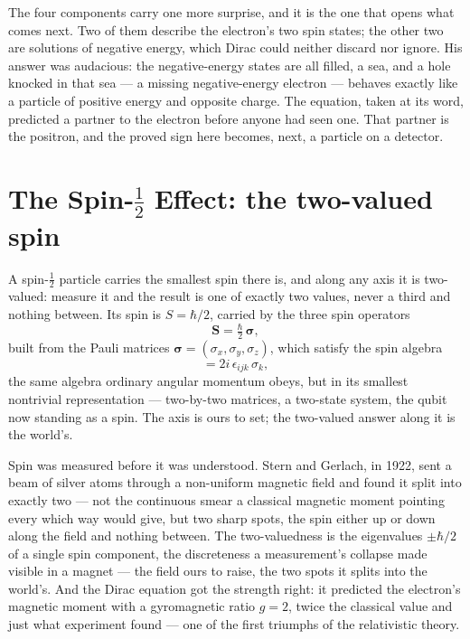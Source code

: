 The four components carry one more surprise, and it is the one that opens what comes next. Two of them describe
the electron's two spin states; the other two are solutions of negative energy, which Dirac could neither
discard nor ignore. His answer was audacious: the negative-energy states are all filled, a sea, and a hole
knocked in that sea --- a missing negative-energy electron --- behaves exactly like a particle of positive
energy and opposite charge. The equation, taken at its word, predicted a partner to the electron before anyone
had seen one. That partner is the positron, and the proved sign here becomes, next, a
particle on a detector.

\section{The Spin-$\tfrac12$ Effect: the two-valued spin}
\label{se:spin-half}

A spin-$\tfrac12$ particle carries the smallest spin there is, and along any axis it is two-valued: measure
it and the result is one of exactly two values, never a third and nothing between. Its spin is $S =
\hbar/2$, carried by the three spin operators
\begin{equation}
  \mathbf{S} = \tfrac{\hbar}{2}\,\boldsymbol{\sigma},
\end{equation}
built from the Pauli matrices $\boldsymbol{\sigma} = (\sigma_x, \sigma_y, \sigma_z)$, which satisfy the spin
algebra
\begin{equation}
  [\sigma_i, \sigma_j] = 2i\,\epsilon_{ijk}\,\sigma_k,
\end{equation}
the same algebra ordinary angular momentum obeys, but in its smallest nontrivial representation ---
two-by-two matrices, a two-state system, the qubit now standing as a spin. The axis is ours to set; the
two-valued answer along it is the world's.

Spin was measured before it was understood. Stern and Gerlach, in 1922, sent a beam of silver atoms through a
non-uniform magnetic field and found it split into exactly two --- not the continuous smear a classical
magnetic moment pointing every which way would give, but two sharp spots, the spin either up or down along the
field and nothing between. The two-valuedness is the eigenvalues $\pm\hbar/2$ of a single spin component, the
discreteness a measurement's collapse made visible in a magnet --- the field ours to raise, the two spots it
splits into the world's. And the Dirac equation got the strength
right: it predicted the electron's magnetic moment with a gyromagnetic ratio $g = 2$, twice the classical
value and just what experiment found --- one of the first triumphs of the relativistic theory.

